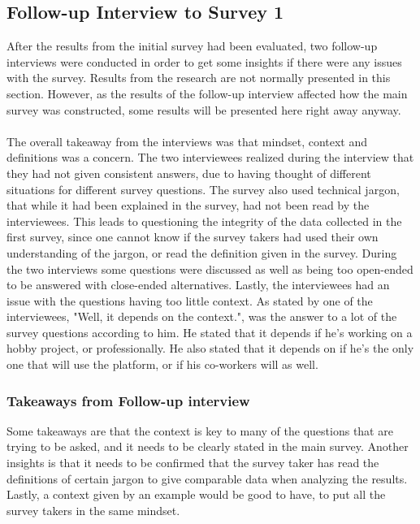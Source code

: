\documentclass{cslthse-msc}
\begin{document}
    \subsection{Follow-up Interview to Survey 1}

    After the results from the initial survey had been evaluated, two follow-up interviews were
    conducted in order to get some insights if there were any issues with
    the survey. Results from the research are not normally presented in this section. However, as the results of the follow-up interview affected how the main survey was constructed, some results will be presented here right away anyway.\\\\
    The overall takeaway from the interviews was that
    mindset, context and definitions was a concern. The two interviewees realized during the interview that they had not given consistent answers, due to having thought of different situations for different survey questions. The survey also used technical jargon, that while it had been explained in the survey, had not been read by the interviewees. This leads to questioning the integrity of the data collected in the first survey, since one cannot know if the survey takers had used their own understanding of the jargon, or read the definition given in the survey. During the two interviews some questions were discussed as well as being too open-ended to be answered with close-ended alternatives. Lastly, the interviewees had an issue with the questions having too little context. As stated by one of the interviewees, "Well, it depends on the context.", was the answer to a lot of the survey questions according to him. He stated that it depends if he's working on a hobby project, or professionally. He also stated that it depends on if he's the only one that will use the platform, or if his co-workers will as well.

    \subsubsection{Takeaways from Follow-up interview}

    Some takeaways are that the context is key to many of the questions that are trying to be asked, and it needs to be clearly stated in the main survey. Another insights is that it needs to be confirmed that the survey taker has read the definitions of certain jargon to give comparable data when analyzing the results. Lastly, a context given by an example would be good to have, to put all the survey takers in the same mindset.
\end{document}
